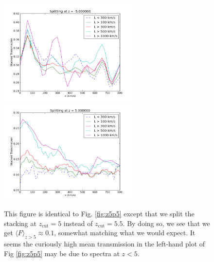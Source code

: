 \documentclass[11pt]{article}
\begin{document}
\begin{figure}[h]
  \centering
  \includegraphics[width=7cm]{Stack_Zlessthan5.png}
  \includegraphics[width=7cm]{Stack_Zgreaterthan5.png}
  \caption{This figure is identical to Fig. \ref{fig:z5p5} except that we split the stacking at $z_{\text{cut}} = 5$ instead of $z_{\text{cut}} = 5.5$. By doing so, we see that we get $\langle F \rangle_{z>5} \approx 0.1$, somewhat matching what we would expect. It seems the curiously high mean transmission in the left-hand plot of Fig \ref{fig:z5p5} may be due to spectra at $z < 5$.}
  \label{fig:todo}
\end{figure}
\end{document}
